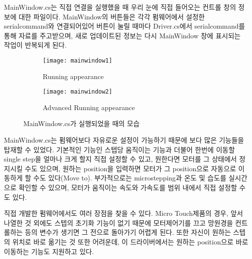 MainWindow.cs는 직접 연결을 실행했을 때 우리 눈에 직접 들어오는 컨트롤 창의 정보에 대한 파일이다. MainWindow의 버튼들은 각각 펌웨어에서 설정한 serialcommand와 연결되어있어 버튼이 눌릴 때마다 Driver.cs에서 serialcommand를 통해 자료를 주고받으며, 새로 업데이트된 정보는 다시 MainWindow 창에 표시되는 작업이 반복되게 된다. 

\begin{figure}[h]
	\begin{subfigure}{0.5\textwidth}
		\begin{center}
			\texttt{[image: mainwindow1]} 
		\end{center}	
		\caption{Running appearance}
		\label{fig:mainwindow1}
	\end{subfigure}
	\begin{subfigure}{0.5\textwidth}
		\begin{center}			
			\texttt{[image: mainwindow2]}
		\end{center}
		\caption{Advanced Running appearance}
		\label{fig:mainwindow2}
	\end{subfigure}
	\caption{MainWindow.cs가 실행되었을 때의 모습}
	\label{fig:mainwindow}
\end{figure}

MainWindow.cs는 펌웨어보다 자유로운 설정이 가능하기 때문에 보다 많은 기능들을 탑재할 수 있었다. 기본적인 기능인 스텝당 움직이는 기능과 더불어 한번에 이동할 single step을 얼마나 크게 할지 직접 설정할 수 있고, 원한다면 모터를 그 상태에서 정지시킬 수도 있으며, 원하는 position을 입력하면 모터가 그 position으로 자동으로 이동하게 할 수도 있다(Move to). 부가적으로는 microstepping과 온도 및 습도를 실시간으로 확인할 수 있으며, 모터가 움직이는 속도와 가속도를 범위 내에서 직접 설정할 수도 있다.

직접 개발한 펌웨어에서도 여러 장점을 찾을 수 있다. Micro Touch제품의 경우, 앞서 나열한 것 외에도 스텝의 초기화 기능이 없기 때문에 모터제어기를 끄고 망원경을 컨트롤하는 등의 변수가 생기면 그 전으로 돌아가기 어렵게 된다. 또한 자신이 원하는 스텝의 위치로 바로 옮기는 것 또한 어려운데, 이 드라이버에서는 원하는 position으로 바로 이동하는 기능도 지원하고 있다. 


